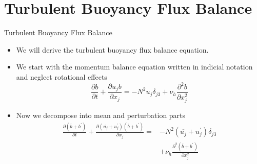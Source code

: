 \section{Turbulent Buoyancy Flux Balance}       %
\begin{frame}{Turbulent Buoyancy Flux Balance}
\begin{itemize}
  	\item We will derive the turbulent buoyancy flux balance equation.
  	\item We start with the momentum balance equation written in indicial notation and neglect rotational effects
  	\begin{equation}
  		\label{eq7}
  		\frac{\partial b}{\partial t} + \frac{\partial u_jb}{\partial x_j} = -N^2u_j \delta_{j3} + \nu_{h} \frac{\partial^2 b}{\partial x_j^2}
  	\end{equation}
  	\item Now we decompose into mean and perturbation parts
  	\begin{align*}
  		\frac{\partial (\overline{b} + b^\prime)}{\partial t} + \frac{\partial (\overline{u_j} + u_j^\prime) (\overline{b} + b^\prime)}{\partial x_j} = &-N^2(\overline{u_j} + u_j^\prime) \delta_{j3} \\&+ \nu_{h} \frac{\partial^2 (\overline{b} + b^\prime)}{\partial x_j^2}
  	\end{align*}
  \end{itemize}
\end{frame}
